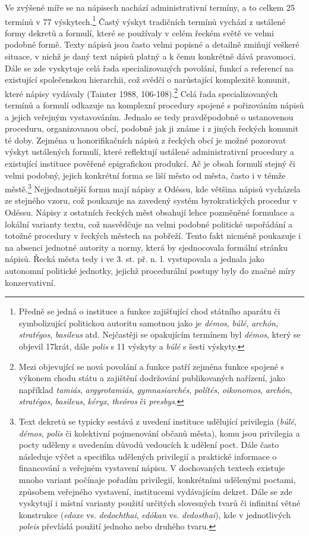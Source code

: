 Ve zvýšené míře se na nápisech nachází administrativní termíny, a to celkem 25 termínů v 77 výskytech.\footnote{Předně se jedná o instituce a funkce zajišťující chod státního aparátu či symbolizující politickou autoritu samotnou jako je {\em démos}, {\em búlé}, {\em archón}, {\em stratégos}, {\em basileus} atd. Nejčastěji se opakujícím termínem byl {\em démos}, který se objevil 17krát, dále {\em polis} s 11 výskyty a {\em búlé} s šesti výskyty.} Častý výskyt tradičních termínů vychází z ustálené formy dekretů a formulí, které se používaly v celém řeckém světě ve velmi podobné formě. Texty nápisů jsou často velmi popisné a detailně zmiňují veškeré situace, v nichž je daný text nápisů platný a k čemu konkrétně dává pravomoci. Dále se zde vyskytuje celá řada specializovaných povolání, funkcí a referencí na existující společenskou hierarchii, což svědčí o narůstající komplexitě komunit, které nápisy vydávaly (Tainter 1988, 106-108).\footnote{Mezi objevující se nová povolání a funkce patří zejména funkce spojené s výkonem chodu státu a zajištění dodržování publikovaných nařízení, jako například {\em tamiás}, {\em argyrotamiás}, {\em gymnasiarchés}, {\em polítés}, {\em oikonomos}, {\em archón}, {\em stratégos}, {\em basileus}, {\em kéryx}, {\em theóros} či {\em presbys}.} Celá řada specializovaných termínů a formulí odkazuje na komplexní procedury spojené s pořizováním nápisů a jejich veřejným vystavováním. Jednalo se tedy pravděpodobně o ustanovenou proceduru, organizovanou obcí, podobně jak ji známe i z jiných řeckých komunit té doby. Zejména u honorifikačních nápisů z řeckých obcí je možné pozorovat výskyt ustálených formulí, které reflektují ustálené administrativní procedury a existující instituce pověřené epigrafickou produkcí. Ač je obsah formulí stejný či velmi podobný, jejich konkrétní forma se liší město od města, často i v témže městě.\footnote{Text dekretů se typicky sestává z uvedení instituce udělující privilegia ({\em búlé}, {\em démos}, {\em polis} či kolektivní pojmenování občanů města), komu jsou privilegia a pocty uděleny s uvedením důvodů vedoucích k udělení poct. Dále často následuje výčet a specifika udělených privilegií a praktické informace o financování a veřejném vystavení nápisu. V dochovaných textech existuje mnoho variant počínaje pořadím privilegií, konkrétními udělenými poctami, způsobem veřejného vystavení, institucemi vydávajícím dekret. Dále se zde vyskytují i místní varianty použití určitých slovesných tvarů či infinitní větné konstrukce ({\em edoxe} vs. {\em dedochthai}, {\em edókan} vs. {\em dedosthai}), kde v jednotlivých {\em poleis} převládá použití jednoho nebo druhého tvaru.} Nejjednotnější formu mají nápisy z Odéssu, kde většina nápisů vycházela ze stejného vzoru, což poukazuje na zavedený systém byrokratických procedur v Odéssu. Nápisy z ostatních řeckých měst obsahují lehce pozměněné formulace a lokální varianty textu, což nasvědčuje na velmi podobné politické uspořádání a totožné procedury v řeckých městech na pobřeží. Tento fakt nicméně poukazuje i na absenci jednotné autority a normy, která by sjednocovala formální stránku nápisů. Řecká města tedy i ve 3. st. př. n. l. vystupovala a jednala jako autonomní politické jednotky, jejichž procedurální postupy byly do značné míry konzervativní.

